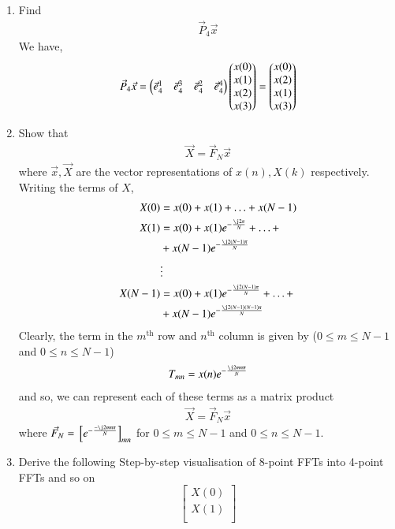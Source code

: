 \documentclass[journal,12pt,twocolumn]{IEEEtran}
\renewcommand\thesection{\arabic{section}}
\begin{document}
\begin{enumerate}[label=\thesection.\arabic*]
\item Find 
\begin{align}
	\vec{P}_4 \vec{x}
\end{align}
\solution We have,
\begin{align}
	\vec{P}_4\vec{x} = \begin{pmatrix}\vec{e}_4^1 & \vec{e}_4^3 & \vec{e}_4^2 & \vec{e}_4^4\end{pmatrix}\begin{pmatrix}x(0)\\x(1)\\x(2)\\x(3)\end{pmatrix} = \begin{pmatrix}x(0)\\x(2)\\x(1)\\x(3)\end{pmatrix}
	\label{eq:x-permute}
\end{align}
\item Show that 
\begin{align}
	\vec{X} = \vec{F}_N\vec{x}
	\label{eq:dft-mat-def}
\end{align}
where $\vec{x}, \vec{X}$ are the vector representations of $x(n), X(k)$ respectively. \\
\solution Writing the terms of $X$, 
\begin{align}
	X(0) &= x(0) + x(1) + \ldots + x(N - 1) \\
	X(1) &= x(0) + x(1)e^{-\frac{\j2\pi}{N}} + \ldots + \nonumber \\
	&+ x(N - 1)e^{-\frac{\j2(N - 1)\pi}{N}} \\
	&\vdots \nonumber \\
	X(N - 1) &= x(0) + x(1)e^{-\frac{\j2(N - 1)\pi}{N}} + \ldots + \nonumber \\
	&+ x(N - 1)e^{-\frac{\j2(N - 1)(N - 1)\pi}{N}}	
\end{align}
Clearly, the term in the $m^{\text{th}}$ row and $n^{\text{th}}$ column is given by ($0 \leq m \leq N - 1$ and $0 \leq n \leq N - 1$) 
\begin{align}
	T_{mn} = x(n)e^{-\frac{\j2mn\pi}{N}} 
\end{align}
and so, we can represent each of these terms as a matrix product
\begin{align}
	\vec{X} = \vec{F}_N\vec{x}
\end{align}
where $\vec{F}_N = \sbrak{e^{-\frac{-\j2mn\pi}{N}}}_{mn}$ for $0 \leq m \leq N - 1$ and $0 \leq n \leq N - 1$. 
\item Derive the following Step-by-step visualisation  of
8-point FFTs into 4-point FFTs and so on
\begin{equation}
	\begin{bmatrix}
		X(0) \\ 
		X(1) \\ 

\end{bmatrix}
\end{equation}
\end{enumerate}
\end{document}
